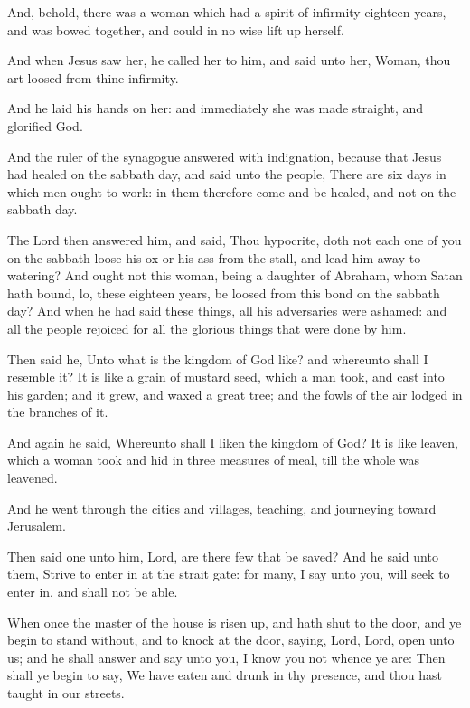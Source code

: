 \Verse And, behold, there was a woman which had a spirit of infirmity eighteen years, and was bowed together, and could in no wise lift up herself.

\Verse And when Jesus saw her, he called her to him, and said unto her, Woman, thou art loosed from thine infirmity.

\Verse And he laid his hands on her: and immediately she was made straight, and glorified God.

\Verse And the ruler of the synagogue answered with indignation, because that Jesus had healed on the sabbath day, and said unto the people, There are six days in which men ought to work: in them therefore come and be healed, and not on the sabbath day.

\Verse The Lord then answered him, and said, Thou hypocrite, doth not each one of you on the sabbath loose his ox or his ass from the stall, and lead him away to watering?  \Verse And ought not this woman, being a daughter of Abraham, whom Satan hath bound, lo, these eighteen years, be loosed from this bond on the sabbath day?  \Verse And when he had said these things, all his adversaries were ashamed: and all the people rejoiced for all the glorious things that were done by him.

\Verse Then said he, Unto what is the kingdom of God like? and whereunto shall I resemble it?  \Verse It is like a grain of mustard seed, which a man took, and cast into his garden; and it grew, and waxed a great tree; and the fowls of the air lodged in the branches of it.

\Verse And again he said, Whereunto shall I liken the kingdom of God?  \Verse It is like leaven, which a woman took and hid in three measures of meal, till the whole was leavened.

\Verse And he went through the cities and villages, teaching, and journeying toward Jerusalem.

\Verse Then said one unto him, Lord, are there few that be saved? And he said unto them, \Verse Strive to enter in at the strait gate: for many, I say unto you, will seek to enter in, and shall not be able.

\Verse When once the master of the house is risen up, and hath shut to the door, and ye begin to stand without, and to knock at the door, saying, Lord, Lord, open unto us; and he shall answer and say unto you, I know you not whence ye are: \Verse Then shall ye begin to say, We have eaten and drunk in thy presence, and thou hast taught in our streets.

